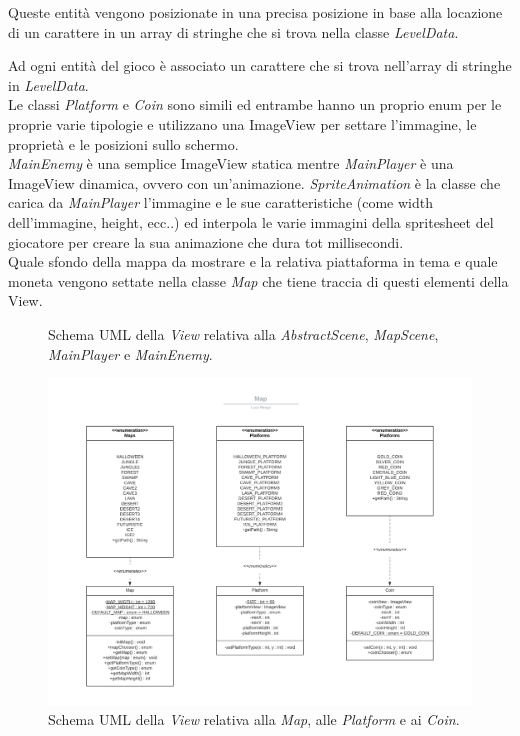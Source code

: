 \textsf{\small Queste entità vengono posizionate in una precisa posizione in base alla locazione di un carattere in un array di stringhe che si trova nella classe \emph{LevelData}.} %

\textsf{\small Ad ogni entità del gioco è associato un carattere che si trova nell'array di stringhe in \emph{LevelData}.}\\ %

\textsf{\small Le classi \emph{Platform} e \emph{Coin} sono simili ed entrambe hanno un proprio enum per le proprie varie tipologie e utilizzano una ImageView per settare l'immagine, le proprietà e le posizioni sullo schermo.}\\

\textsf{\small \emph{MainEnemy} è una semplice ImageView statica mentre \emph{MainPlayer} è una ImageView dinamica, ovvero con un'animazione.}
\textsf{\small \emph{SpriteAnimation} è la classe che carica da \emph{MainPlayer} l'immagine e le sue caratteristiche (come width dell'immagine, height, ecc..) ed interpola le varie immagini della spritesheet del giocatore per creare la sua animazione che dura tot millisecondi.}\\

\textsf{\small  Quale sfondo della mappa da mostrare e la relativa piattaforma in tema e quale moneta vengono settate nella classe \emph{Map} che tiene traccia di questi elementi della View.}\\


\begin{figure}[H]
	\centering{} %
	\caption{Schema UML della \emph{View} relativa alla \emph{AbstractScene}, \emph{MapScene}, \emph{MainPlayer} e \emph{MainEnemy}.}
	\label{img}
\end{figure}

\begin{figure}[H]
	\centering{}
	\includegraphics[width=1.3\textwidth]{./img/map_uml.png} 
	\caption{Schema UML della \emph{View} relativa alla \emph{Map}, alle \emph{Platform} e ai \emph{Coin}.}
	\label{img:map_uml}
\end{figure}

